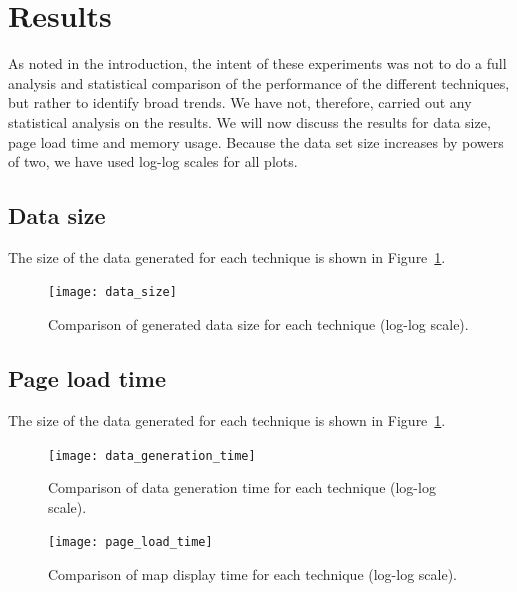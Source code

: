 \documentclass[acmtocl,acmnow]{acmtrans2m}
\begin{document}
\section{Results}
\label{sec-results}

As noted in the introduction, the intent of these experiments was not to
do a full analysis and statistical comparison of the performance of the
different techniques, but rather to identify broad trends. We have not,
therefore, carried out any statistical analysis on the results. We will
now discuss the results for data size, page load time and memory usage.
Because the data set size increases by powers of two, we have used
log-log scales for all plots.



\subsection{Data size}

The size of the data generated for each technique is shown in
Figure~\ref{fig-data-size}.


\begin{figure}
	\begin{center}
		\texttt{[image: data\_size]}
	\end{center}
	\caption{Comparison of generated data size for each technique (log-log scale).}
	\label{fig-data-size}
\end{figure}


\subsection{Page load time}

The size of the data generated for each technique is shown in
Figure~\ref{fig-data-size}.


\begin{figure}
	\begin{center}
		\texttt{[image: data\_generation\_time]}
	\end{center}
	\caption{Comparison of data generation time for each technique (log-log scale).}
	\label{fig-data-generation-time}
\end{figure}


\begin{figure}
	\begin{center}
		\texttt{[image: page\_load\_time]}
	\end{center}
	\caption{Comparison of map display time for each technique (log-log scale).}
	\label{fig-page-load-time}
\end{figure}
\end{document}
